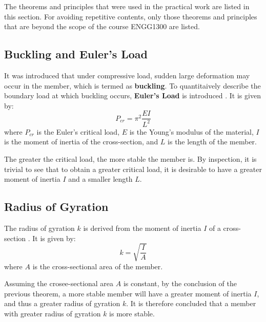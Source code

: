 \documentclass[fleqn,10pt]{SelfArx} %
\begin{document}
The theorems and principles that were used in the practical work are listed in this section.
	For avoiding repetitive contents, only those theorems and principles that are beyond
	the scope of the course ENGG1300 are listed.

\subsection{Buckling and Euler's Load}

It was introduced that under compressive load, sudden large deformation may occur in the
	member, which is termed as \textbf{buckling}. To quantitaively describe the boundary
	load at which buckling occurs, \textbf{Euler's Load} is introduced
	\cite{Coates:2018-Structural}. It is given by:
	\begin{equation}
		P_{cr} = \pi^2 \frac{EI}{L^2}
		\label{eq:eulers-load}
	\end{equation}
	where $P_{cr}$ is the Euler's critical load, $E$ is the Young's modulus of the material,
	$I$ is the moment of inertia of the cross-section, and $L$ is the length of the member.

The greater the critical load, the more stable the member is. By inspection, it is trivial
	to see that to obtain a greater critical load, it is desirable to have a greater
	moment of inertia $I$ and a smaller length $L$.

\subsection{Radius of Gyration}

The radius of gyration $k$ is derived from the moment of inertia $I$ of a cross-section
	\cite{Riley:2007-Mechanics}. It is given by:
	\begin{equation}
		k = \sqrt{\frac{I}{A}}
		\label{eq:radius-of-gyration}
	\end{equation}
	where $A$ is the cross-sectional area of the member.

Assuming the crosee-sectional area $A$ is constant, by the conclusion of the previous
	theorem, a more stable member will have a greater moment of inertia $I$, and thus
	a greater radius of gyration $k$. It is therefore concluded that a member with
	greater radius of gyration $k$ is more stable.

\end{document}
